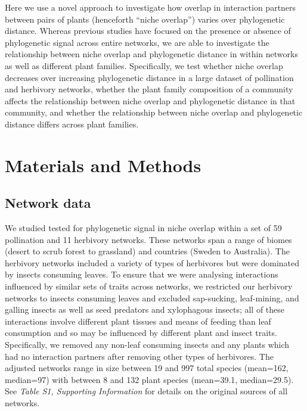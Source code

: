 \documentclass[12pt]{article}
\begin{document}
\begin{spacing}{1.5}
  Here we use a novel approach to investigate how overlap in 
  interaction partners between pairs of plants (henceforth ``niche 
  overlap'') varies over phylogenetic distance. Whereas previous 
  studies have focused on the presence or absence of phylogenetic
  signal across entire networks, we are able to investigate the
  relationship between niche overlap and phylogenetic distance in
  within networks as well as different plant families. Specifically,
  we test whether niche overlap decreases over increasing phylogenetic
  distance in a large dataset of pollination and herbivory networks, 
  whether the plant family composition of a community affects the
  relationship between niche overlap and phylogenetic distance in that 
  community, and whether the relationship between niche overlap and 
  phylogenetic distance differs across plant families.


\section*{Materials and Methods}

\subsection*{Network data}

  We studied tested for phylogenetic signal in niche overlap within a 
  set of 59 pollination and 11 herbivory networks. These networks span 
  a range of biomes (desert to scrub forest to grassland) and 
  countries (Sweden to Australia). The herbivory networks included a 
  variety of types of herbivores but were dominated by insects 
  consuming leaves. To ensure that we were analysing interactions 
  influenced by similar sets of traits across networks, we restricted 
  our herbivory networks to insects consuming leaves and excluded 
  sap-sucking, leaf-mining, and galling insects as well as seed 
  predators and xylophagous insects; all of these interactions involve 
  different plant tissues and means of feeding than leaf consumption 
  and so may be influenced by different plant and insect traits. 
  Specifically, we removed any non-leaf consuming insects and any 
  plants which had no interaction partners after removing other types  
  of herbivores. The adjusted networks range in size between 19 and 
  997 total species (mean=162, median=97) with  between 8 and 132 
  plant species (mean=39.1, median=29.5). See \emph{Table S1, 
  Supporting Information} for details on the original sources of all 
  networks. 


\end{spacing}
\end{document}
